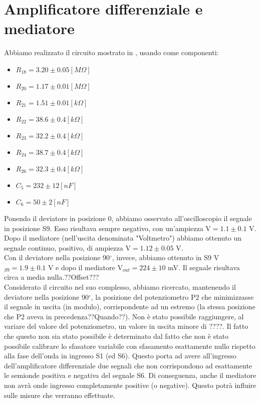 \section{Amplificatore differenziale e mediatore}
Abbiamo realizzato il circuito mostrato in , usando come componenti:
\begin{itemize}
\item $R_{18}=3.20 \pm 0.05[M\Omega]$
\item $R_{20}=1.17 \pm 0.01[M\Omega]$
\item $R_{21}=1.51 \pm 0.01[k\Omega]$
\item $R_{22}=38.6 \pm 0.4[k\Omega]$
\item $R_{23}=32.2 \pm 0.4[k\Omega]$
\item $R_{24}=38.7 \pm 0.4[k\Omega]$
\item $R_{26}=32.3 \pm 0.4[k\Omega]$
\item $C_5=232 \pm 12[nF]$
\item $C_6=50 \pm 2[nF]$
\end{itemize}
Ponendo il deviatore in posizione 0, abbiamo osservato all'oscilloscopio il segnale in posizione S9. Esso risultava sempre negativo, con un'ampiezza V$ = 1.1 \pm 0.1$ V. Dopo il mediatore (nell'uscita denominata "Voltmetro") abbiamo ottenuto un segnale continuo, positivo, di ampiezza V$ = 1.12 \pm 0.05$ V.\\
Con il deviatore nella posizione 90$^\circ$, invece, abbiamo ottenuto in S9 V$_{S9} = 1.9 \pm 0.1$ V e dopo il mediatore V$_{out} = 224 \pm 10$ mV. Il segnale risultava circa a media nulla.??Offset???\\
Considerato il circuito nel suo complesso, abbiamo ricercato, mantenendo il deviatore nella posizione 90$^\circ$, la posizione del potenziometro P2 che minimizzasse il segnale in uscita (in modulo), corrispondente ad un estremo (la stessa posizione che P2 aveva in precedenza??Quando??). Non è stato possibile raggiungere, al variare del valore del potenziometro, un valore in uscita minore di ????. Il fatto che questo non sia stato possibile è determinato dal fatto che non è stato possibile calibrare lo sfasatore variabile con sfasamento esattamente nullo rispetto alla fase dell'onda in ingresso S1 (ed S6).
Questo porta ad avere all'ingresso dell'amplificatore differenziale due segnali che non corrispondono ad esattamente le semionde positiva e negativa del segnale S6. Di conseguenza, anche il mediatore non avrà onde ingresso completamente positive (o negative). Questo potrà influire sulle misure che verranno effettuate.\\
